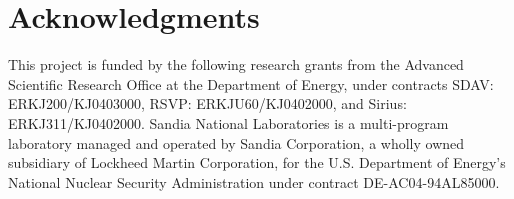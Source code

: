 \documentclass[letterpaper,twocolumn,10pt]{article}
\begin{document}
\section{Acknowledgments}

This project is funded by the following research grants from the Advanced
Scientific Research Office at the Department of Energy, under contracts SDAV:
ERKJ200/KJ0403000, RSVP: ERKJU60/KJ0402000, and Sirius: ERKJ311/KJ0402000.
Sandia National Laboratories is a multi-program laboratory managed and operated
by Sandia Corporation, a wholly owned subsidiary of Lockheed Martin
Corporation, for the U.S. Department of Energy's National Nuclear Security
Administration under contract DE-AC04-94AL85000.

{\footnotesize 
}

\end{document}
